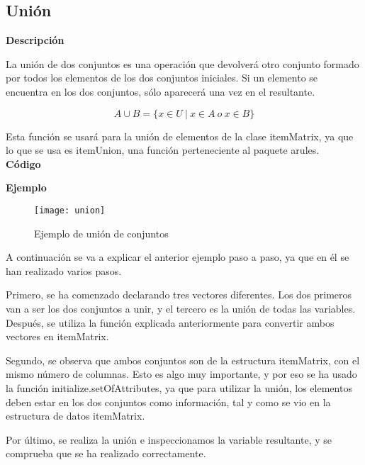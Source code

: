 \subsection{Uni\'on}

    \textbf{Descripci\'on}

    La uni\'on de dos conjuntos es una operaci\'on que devolver\'a otro conjunto formado por 
    todos los elementos de los dos conjuntos iniciales. Si un elemento se encuentra en los dos 
    conjuntos, s\'olo aparecer\'a una vez en el resultante.

    \[
    A \cup B = \{x\in U ~ | ~ x\in A ~ o ~ x\in B \}
    \]

    Esta funci\'on se usar\'a para la uni\'on de elementos de la clase itemMatrix, ya que lo que 
    se usa es itemUnion, una funci\'on perteneciente al paquete arules.
    \\


    \textbf{C\'odigo}

    
    \clearpage

    \textbf{Ejemplo}

    \begin{figure}[H]
        \centering
        \texttt{[image: union]}
        \caption{Ejemplo de uni\'on de conjuntos}
        \label{fig:union}
    \end{figure}

    A continuaci\'on se va a explicar el anterior ejemplo paso a paso, ya que en \'el se han realizado varios pasos.

    Primero, se ha comenzado declarando tres vectores diferentes. Los dos primeros van a ser los dos conjuntos a unir, y el 
    tercero es la uni\'on de todas las variables. Despu\'es, se utiliza la funci\'on explicada anteriormente para convertir ambos 
    vectores en itemMatrix.

    Segundo, se observa que ambos conjuntos son de la estructura itemMatrix, con el mismo n\'umero de columnas. Esto es algo muy 
    importante, y por eso se ha usado la funci\'on initialize.setOfAttributes, ya que para utilizar la uni\'on, los elementos deben 
    estar en los dos conjuntos como informaci\'on, tal y como se vio en la estructura de datos itemMatrix.

    Por \'ultimo, se realiza la uni\'on e inspeccionamos la variable resultante, y se comprueba que se ha realizado correctamente.



